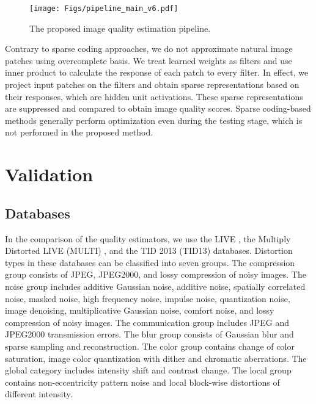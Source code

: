 \documentclass[draftcls,12pt, onecolumn]{IEEEtran}
\begin{document}
\begin{figure}[htbp!]
	\begin{center}
		\noindent
		\texttt{[image: Figs/pipeline\_main\_v6.pdf]}
		\caption{The proposed image quality estimation pipeline.}
		\label{fig:main}
	\end{center}
	\vspace{-6.0mm}
\end{figure}

Contrary to sparse coding approaches, we do not approximate natural image patches using overcomplete basis. We treat learned weights as filters and use inner product to calculate the response of each patch to every filter. In effect, we project input patches on the filters and obtain sparse representations based on their responses, which are hidden unit activations. These sparse representations are suppressed and compared to obtain image quality scores. Sparse coding-based methods generally perform optimization even during the testing stage, which is not performed in the proposed method. 



 \section{Validation}
\vspace{-3.0mm}
\subsection{Databases}
In the comparison of the quality estimators, we use the LIVE \cite{live2006}, the Multiply Distorted LIVE (MULTI) \cite{multi2012}, and the TID 2013 (TID13) \cite{tid13} databases. Distortion types in these databases can be classified into seven groups. The compression group consists of JPEG, JPEG2000, and lossy compression of noisy images. The noise group includes additive Gaussian noise, additive noise, spatially correlated noise, masked noise, high frequency noise, impulse noise, quantization noise, image denoising, multiplicative Gaussian noise, comfort noise, and lossy compression of noisy images. The communication group includes JPEG and JPEG2000 transmission errors. The blur group consists of Gaussian blur and sparse sampling and reconstruction. The color group contains change of color saturation, image color quantization with dither and chromatic aberrations. The global category includes intensity shift and contrast change. The local group contains non-eccentricity pattern noise and local block-wise distortions of different intensity. 
\end{document}
